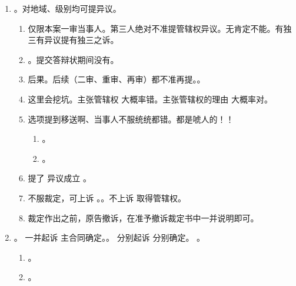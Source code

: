 \begin{enumerate}
\begin{enumerate}
\begin{enumerate}
                  \item {}。
                  \item {}。。
                \end{enumerate}
        \end{enumerate}
  \item {}。对地域、级别均可提异议。
        \begin{enumerate}
          \item 仅限本案一审当事人。第三人绝对不准提管辖权异议。\yi 无肯定不能。\er 有独三有异议提有独三之诉。
          \item {}。提交答辩状期间没有。
          \item 后果。后续（二审、重审、再审）都不准再提。。
          \item 这里会挖坑。主张管辖权 \yjt 大概率错。主张管辖权的理由 \yjt 大概率对。
          \item 选项提到移送啊、当事人不服统统都错。都是唬人的！！
                \begin{enumerate}
                  \item {}。
                  \item {}。
                \end{enumerate}
          \item 提了 \yjt 异议成立 \yjt {}。
          \item 不服裁定，可上诉 \yjt {}。。不上诉 \yjt 取得管辖权。
          \item 裁定作出之前，原告撤诉，在准予撤诉裁定书中一并说明即可。
        \end{enumerate}
  \item {}。
        \yi 一并起诉 \yjt 主合同确定。。
        \er 分别起诉 \yjt 分别确定。
        \san {}。
        \begin{enumerate}
          \item {}。
          \item {}。
        \end{enumerate}
\end{enumerate}
